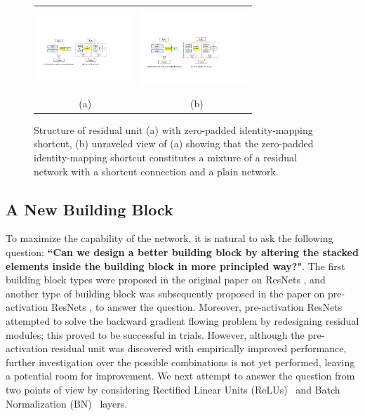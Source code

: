 \documentclass[10pt,twocolumn,letterpaper]{article}
\begin{document}
\begin{figure}[t]
\begin{center}
\begin{tabular}{cc}
\includegraphics[trim = 4mm 0mm 4mm 0mm, clip, width=35mm, height = 31mm]{Images2/zeropad1.pdf} &
\includegraphics[trim = 0mm 0mm 0mm 0mm, clip,width=40mm, height = 31mm]{Images2/zeropad2.pdf} \\
(a) & \  (b)
\end{tabular}
\end{center}
\caption{Structure of residual unit (a) with zero-padded identity-mapping shortcut, (b) unraveled view of (a) showing that the zero-padded identity-mapping shortcut constitutes a mixture of a residual network with a shortcut connection and a plain network.}
\label{fig:zeropad}
\end{figure}

\subsection{A New Building Block}
\label{ssec:newblock}
To maximize the capability of the network, it is natural to ask the following question: {\bf ``Can we design a better building block by altering the stacked elements inside the building block in more principled way?"}. The first building block types were proposed in the original paper on ResNets \cite{resnet}, and another type of building block was subsequently proposed in the paper on pre-activation ResNets \cite{preresnet}, to answer the question. Moreover, pre-activation ResNets attempted to solve the backward gradient flowing problem \cite{preresnet} by redesigning residual modules; this proved to be successful in trials. However, although the pre-activation residual unit was discovered with empirically improved performance, further investigation over the possible combinations is not yet performed, leaving a potential room for improvement. We next attempt to answer the question from two points of view by considering Rectified Linear Units (ReLUs)~\cite{ReLU} and Batch Normalization (BN)~\cite{BN} layers.
\end{document}
